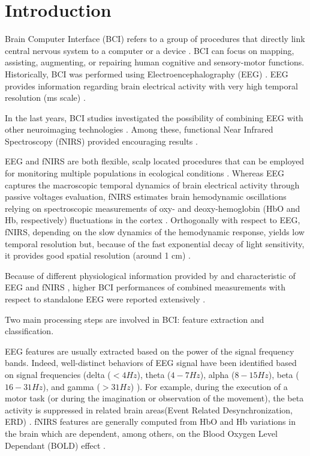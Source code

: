 \documentclass[12pt ]{iopart}
\begin{document}
\section{Introduction}

Brain Computer Interface (BCI) refers to a group of procedures that directly link  central nervous system to a computer or a device \parencite{wolpaw2000brain}. BCI can focus on mapping, assisting, augmenting, or repairing human cognitive and sensory-motor functions. 
Historically, BCI was performed using Electroencephalography (EEG) \parencite{lotte2007review}. EEG  provides information regarding brain electrical activity with very high temporal resolution (ms scale) \parencite{hallez2007review}. 

In the last years, BCI studies investigated the possibility of combining EEG with other neuroimaging technologies \parencite{pfurtscheller2010hybrid}. Among these, functional Near Infrared Spectroscopy (fNIRS) provided encouraging results \parencite{fazli2012enhanced}. 

EEG and fNIRS are both flexible, scalp located procedures that can be employed for monitoring multiple populations in ecological conditions \parencite{farroni2013infant, costantini2013studying, zappasodi2017prognostic, watanabe1999neonatal}. Whereas EEG captures the macroscopic temporal dynamics of brain electrical activity through passive voltages evaluation, fNIRS estimates brain hemodynamic oscillations  relying on spectroscopic measurements of oxy- and deoxy-hemoglobin (HbO and Hb, respectively) fluctuations in the cortex \parencite{villringer1997non, ferrari2012brief}. Orthogonally with respect to EEG, fNIRS, depending on the slow dynamics of the hemodynamic response, yields low temporal resolution but, because of the fast exponential decay of light sensitivity, it provides good spatial resolution (around 1 cm) \parencite{chiarelli2016combining, chiarelli2015comparison}. 

Because of different physiological information provided by and characteristic of EEG and fNIRS \parencite{croce2017exploiting}, higher BCI performances  of combined measurements with respect to standalone EEG were reported extensively \parencite{fazli2012enhanced, khan2014decoding, hong2015classification, chiarelliREVdaaggiungere} .

Two main processing steps are involved in BCI:  feature extraction and classification. 

EEG features are usually extracted based on the power of the signal frequency bands. Indeed, well-distinct behaviors of EEG signal have been identified based on signal frequencies (delta ($< 4 Hz$), theta ($4-7 Hz$), alpha ($8-15 Hz$), beta ($16-31 Hz$), and gamma ($> 31 Hz$) \parencite{nuwer1988quantitative}). For example, during the execution of a motor task (or during the imagination or observation of the movement), the beta activity is suppressed in related brain areas(Event Related Desynchronization, ERD) \parencite{pfurtscheller2001functional, pfurtscheller2006future}.  
fNIRS  features are generally  computed from  HbO and Hb variations in the brain which are dependent, among others, on the  Blood Oxygen Level Dependant (BOLD) effect \parencite{steinbrink2006illuminating, naseer2015fnirs}. 
\end{document}
